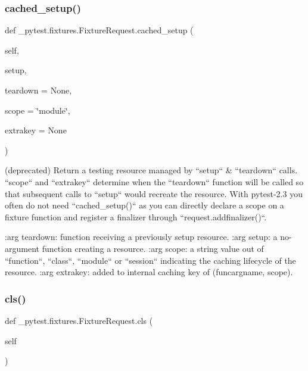 \subsubsection{\texorpdfstring{cached\+\_\+setup()}{cached\_setup()}}
{\footnotesize\ttfamily def \+\_\+pytest.\+fixtures.\+Fixture\+Request.\+cached\+\_\+setup (\begin{DoxyParamCaption}\item[{}]{self,  }\item[{}]{setup,  }\item[{}]{teardown = {\ttfamily None},  }\item[{}]{scope = {\ttfamily \char`\"{}module\char`\"{}},  }\item[{}]{extrakey = {\ttfamily None} }\end{DoxyParamCaption})}

\begin{DoxyVerb}(deprecated) Return a testing resource managed by ``setup`` &
``teardown`` calls.  ``scope`` and ``extrakey`` determine when the
``teardown`` function will be called so that subsequent calls to
``setup`` would recreate the resource.  With pytest-2.3 you often
do not need ``cached_setup()`` as you can directly declare a scope
on a fixture function and register a finalizer through
``request.addfinalizer()``.

:arg teardown: function receiving a previously setup resource.
:arg setup: a no-argument function creating a resource.
:arg scope: a string value out of ``function``, ``class``, ``module``
    or ``session`` indicating the caching lifecycle of the resource.
:arg extrakey: added to internal caching key of (funcargname, scope).
\end{DoxyVerb}
 \mbox{\label{class__pytest_1_1fixtures_1_1_fixture_request_ad5b658c8c4dab7339e2ae529f2f63b28}} 
\subsubsection{\texorpdfstring{cls()}{cls()}}
{\footnotesize\ttfamily def \+\_\+pytest.\+fixtures.\+Fixture\+Request.\+cls (\begin{DoxyParamCaption}\item[{}]{self }\end{DoxyParamCaption})}

